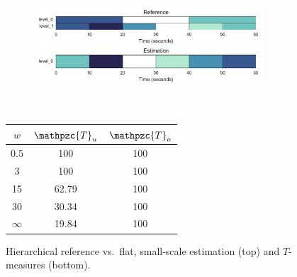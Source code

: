 \documentclass{article}
\def\shag{\ensuremath{\mathpzc{T}}}
\begin{document}
\begin{figure}[t]
  \centering
  \begin{subfigure}{0.5\textwidth}
    \centering
    \includegraphics[width=0.94\textwidth]{figs/hier-flatsmall.pdf}
  \end{subfigure}%
  \\
  \begin{minipage}{0.5\textwidth}
    \centering
    \vspace{10pt}
    \begin{tabular}{|c|c|c|}
      \hline
      $w$       & $\shag_u$    & $\shag_o$      \\
      \hline
      0.5       & 100       & 100      \\     
      3         & 100       & 100      \\
      15        & 62.79     & 100    \\
      30        & 30.34     & 100    \\
      $\infty$  & 19.84     & 100    \\
      \hline
    \end{tabular}
  \end{minipage}
  \caption{Hierarchical reference vs.\ flat, small-scale estimation (top) and $T$-measures (bottom).}
  \label{fig:hier-flatsmall}
\end{figure}
\end{document}
